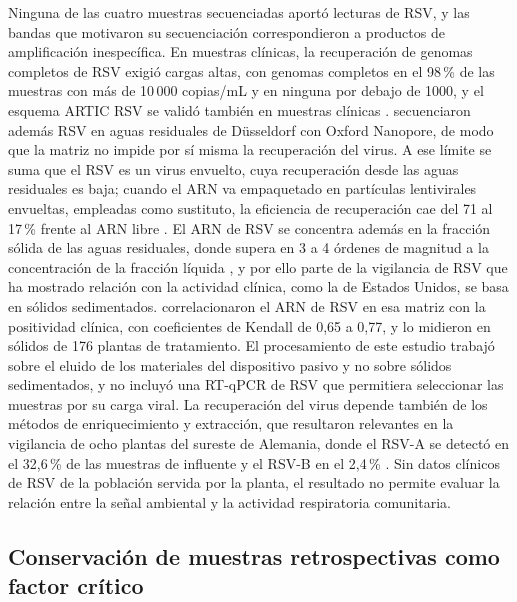 Ninguna de las cuatro muestras secuenciadas aportó lecturas de RSV, y las bandas que motivaron su secuenciación correspondieron a productos de amplificación inespecífica. En muestras clínicas, la recuperación de genomas completos de RSV exigió cargas altas, con genomas completos en el 98\,\% de las muestras con más de 10\,000 copias/mL y en ninguna por debajo de 1000, y el esquema ARTIC RSV se validó también en muestras clínicas \cite{Maloney_2025}.  secuenciaron además RSV en aguas residuales de Düsseldorf con Oxford Nanopore, de modo que la matriz no impide por sí misma la recuperación del virus. A ese límite se suma que el RSV es un virus envuelto, cuya recuperación desde las aguas residuales es baja; cuando el ARN va empaquetado en partículas lentivirales envueltas, empleadas como sustituto, la eficiencia de recuperación cae del 71 al 17\,\% frente al ARN libre \cite{ToribioAvedillo_2024}. El ARN de RSV se concentra además en la fracción sólida de las aguas residuales, donde supera en 3 a 4 órdenes de magnitud a la concentración de la fracción líquida \cite{RoldanHernandez_2023}, y por ello parte de la vigilancia de RSV que ha mostrado relación con la actividad clínica, como la de Estados Unidos, se basa en sólidos sedimentados.  correlacionaron el ARN de RSV en esa matriz con la positividad clínica, con coeficientes de Kendall de 0,65 a 0,77, y  lo midieron en sólidos de 176 plantas de tratamiento. El procesamiento de este estudio trabajó sobre el eluido de los materiales del dispositivo pasivo y no sobre sólidos sedimentados, y no incluyó una RT-qPCR de RSV que permitiera seleccionar las muestras por su carga viral. La recuperación del virus depende también de los métodos de enriquecimiento y extracción, que resultaron relevantes en la vigilancia de ocho plantas del sureste de Alemania, donde el RSV-A se detectó en el 32,6\,\% de las muestras de influente y el RSV-B en el 2,4\,\% \cite{Geissler_2025}. Sin datos clínicos de RSV de la población servida por la planta, el resultado no permite evaluar la relación entre la señal ambiental y la actividad respiratoria comunitaria.

\subsection{Conservación de muestras retrospectivas como factor crítico}


